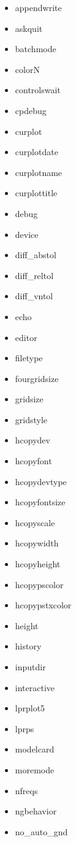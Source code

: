 {\footnotesize 
\begin{multicols}{3}\begin{itemize}[leftmargin=0pt,label={}]
    \item appendwrite
    \item askquit
    \item batchmode
    \item colorN
    \item controlswait
    \item cpdebug
    \item curplot
    \item curplotdate
    \item curplotname
    \item curplottitle
    \item debug
    \item device
    \item diff\_abstol
    \item diff\_reltol
    \item diff\_vntol
    \item echo 
    \item editor
    \item filetype
    \item fourgridsize
    \item gridsize
    \item gridstyle
    \item hcopydev
    \item hcopyfont
    \item hcopydevtype
    \item hcopyfontsize
    \item hcopyscale
    \item hcopywidth
    \item hcopyheight
    \item hcopypscolor
    \item hcopypstxcolor
    \item height
    \item history
    \item inputdir
    \item interactive
    \item lprplot5
    \item lprps
    \item modelcard
    \item moremode
    \item nfreqs
    \item ngbehavior
    \item no\_auto\_gnd

\end{itemize}
\end{multicols}}
